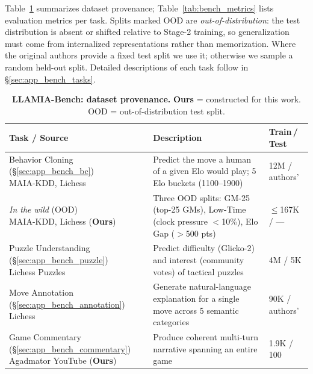 Table~\ref{tab:bench_dataset} summarizes dataset provenance;
Table~\ref{tab:bench_metrics} lists evaluation metrics per task.
Splits marked OOD are \emph{out-of-distribution}: the test distribution is absent or shifted relative to Stage-2 training, so generalization must come from internalized representations rather than memorization.
Where the original authors provide a fixed test split we use it; otherwise we sample a random held-out split.
Detailed descriptions of each task follow in \S\ref{sec:app_bench_tasks}.

\begin{table}[ht]
\centering
\small
\setlength{\tabcolsep}{5pt}
\renewcommand{\arraystretch}{1.4}
\caption{\textbf{LLAMIA-Bench: dataset provenance.} \textbf{Ours} = constructed for this work. OOD = out-of-distribution test split.}
\label{tab:bench_dataset}
\vspace{4pt}
\begin{tabular}{p{4.8cm} p{5.8cm} p{2.4cm}}
\toprule
\textbf{Task / Source} & \textbf{Description} & \textbf{Train\,/\,Test} \\
\midrule
\makecell[tl]{Behavior Cloning (\S\ref{sec:app_bench_bc}) \\ {\scriptsize MAIA-KDD, Lichess~\cite{mcilroy2020aligning}}}
  & Predict the move a human of a given Elo would play; 5 Elo buckets (1100--1900)
  & 12M / authors' \\
\makecell[tl]{\quad\emph{In the wild} (OOD) \\ {\scriptsize MAIA-KDD, Lichess (\textbf{Ours})}}
  & Three OOD splits: GM-25 (top-25 GMs), Low-Time (clock pressure $<$10\%), Elo Gap ($>$500 pts)
  & $\leq$167K / --- \\
\midrule
\makecell[tl]{Puzzle Understanding (\S\ref{sec:app_bench_puzzle}) \\ {\scriptsize Lichess Puzzles~\cite{lichess2024puzzles}}}
  & Predict difficulty (Glicko-2) and interest (community votes) of tactical puzzles
  & 4M / 5K \\
\midrule
\makecell[tl]{Move Annotation (\S\ref{sec:app_bench_annotation}) \\ {\scriptsize Lichess~\cite{jhamtani-etal-2018-learning}}}
  & Generate natural-language explanation for a single move across 5 semantic categories
  & 90K / authors' \\
\midrule
\makecell[tl]{Game Commentary (\S\ref{sec:app_bench_commentary}) \\ {\scriptsize Agadmator YouTube (\textbf{Ours})}}
  & Produce coherent multi-turn narrative spanning an entire game
  & 1.9K / 100 \\
\bottomrule
\end{tabular}
\end{table}

